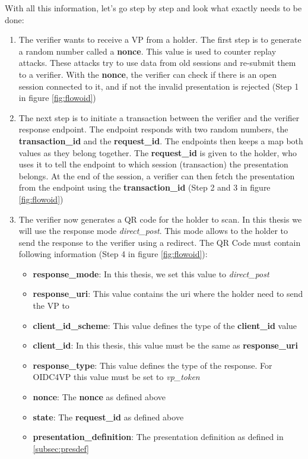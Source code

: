 \documentclass[
	a4paper               %
	,BCOR=0mm            %
	,bibliography=totoc   %
	,listof=totoc         %
	,monolingual
	,twoside=false
]{bfhthesis}              %
\begin{document}
With all this information, let's go step by step and look what exactly needs to be done:
\begin{enumerate}
	\item The verifier wants to receive a VP from a holder. The first step is to generate a random number called a \textbf{nonce}. This value is used to counter replay attacks. These attacks try to use data from old sessions and re-submit them to a verifier. With the \textbf{nonce}, the verifier can check if there is an open session connected to it, and if not the invalid presentation is rejected (Step 1 in figure \ref{fig:flowoid})
	\item The next step is to initiate a transaction between the verifier and the verifier response endpoint. The endpoint responds with two random numbers, the \textbf{transaction\_id} and the \textbf{request\_id}. The endpoints then keeps a map both values as they belong together. The \textbf{request\_id} is given to the holder, who uses it to tell the endpoint to which session (transaction) the presentation belongs. At the end of the session, a verifier can then fetch the presentation from the endpoint using the \textbf{transaction\_id} (Step 2 and 3 in figure \ref{fig:flowoid})
	\item The verifier now generates a QR code for the holder to scan. In this thesis we will use the response mode \textit{direct\_post}. This mode allows to the holder to send the response to the verifier using a redirect. The QR Code must contain following information (Step 4 in figure \ref{fig:flowoid}):
	\begin{itemize}
		\item \textbf{response\_mode}: In this thesis, we set this value to \textit{direct\_post}
		\item \textbf{response\_uri}: This value contains the uri where the holder need to send the VP to
		\item \textbf{client\_id\_scheme}: This value defines the type of the \textbf{client\_id} value
		\item \textbf{client\_id}: In this thesis, this value must be the same as \textbf{response\_uri}
		\item \textbf{response\_type}: This value defines the type of the response. For OIDC4VP this value must be set to \textit{vp\_token}
		\item \textbf{nonce}: The \textbf{nonce} as defined above
		\item \textbf{state}: The \textbf{request\_id} as defined above
		\item \textbf{presentation\_definition}: The presentation definition as defined in \ref{subsec:presdef}

\end{itemize}
\end{enumerate}
\end{document}
